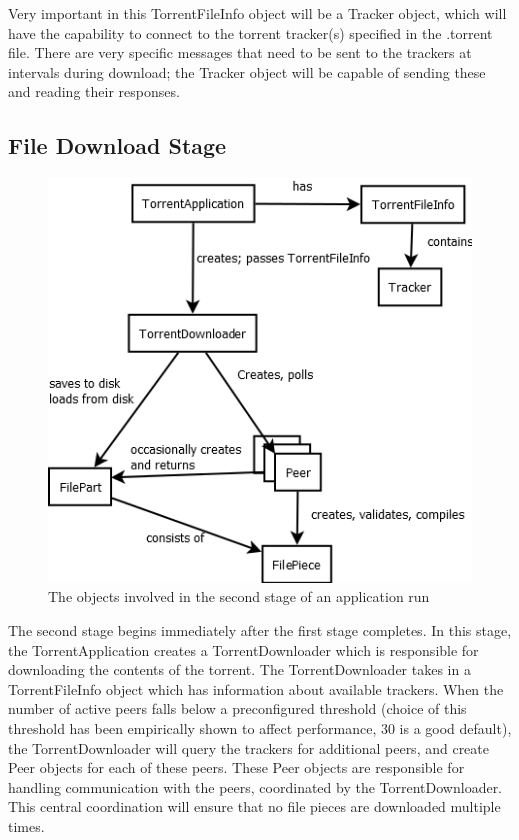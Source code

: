 \documentclass[letter]{scrartcl}
\begin{document}
Very important in this TorrentFileInfo object will be a Tracker object, which will have the capability to connect to the torrent tracker(s) specified in the .torrent file.  There are very specific messages that need to be sent to the trackers at intervals during download; the Tracker object will be capable of sending these and reading their responses.

\subsection{File Download Stage}

\begin{figure}[h]
\centering
\includegraphics[scale=.5]{StepTwo.png}
\caption{The objects involved in the second stage of an application run}
\end{figure}

The second stage begins immediately after the first stage completes.   In this stage, the TorrentApplication creates a TorrentDownloader which is responsible for downloading the contents of the torrent.  The TorrentDownloader takes in a TorrentFileInfo object which has information about available trackers.  When the number of active peers falls below a preconfigured threshold (choice of this threshold has been empirically shown to affect performance, 30 is a good default), the TorrentDownloader will query the trackers for additional peers, and create Peer objects for each of these peers.  These Peer objects are responsible for handling communication with the peers, coordinated by the TorrentDownloader.  This central coordination will ensure that no file pieces are downloaded multiple times.\\
\end{document}
